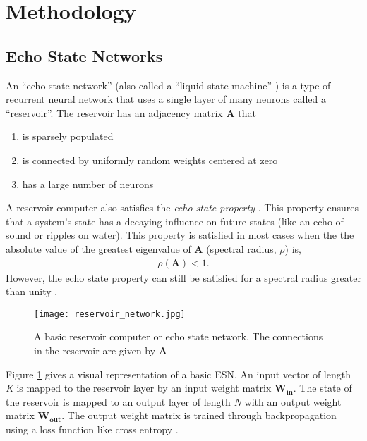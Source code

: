 \section{Methodology}

\subsection{Echo State Networks}
An ``echo state network'' (also
called a ``liquid state machine'' \cite{lukosevicius_practical_2012}) is a type
of recurrent neural network that uses a single layer of many neurons called a
``reservoir''. The reservoir has an adjacency matrix $\bm{A}$ that
\begin{enumerate}
	\item is sparsely populated
	\item is connected by uniformly random weights centered at zero
	\item has a large number of neurons
\end{enumerate}
A reservoir computer also satisfies the \textit{echo state property}
\cite{pathak_model-free_2018, lukosevicius_reservoir_2009}. This
property ensures that a system's state has a decaying influence on future states
(like an echo of sound or ripples on water). This property is satisfied in most
cases when the the absolute value of the greatest eigenvalue of
$\bm{A}$ (spectral radius, $\rho$) \cite{lukosevicius_reservoir_2009} is,
\begin{align}
	\rho(\bm{A}) < 1.
\end{align}
However, the echo state property can still be satisfied for a spectral radius
greater than unity \cite{lukosevicius_practical_2012}.

\begin{figure}[H]
	\texttt{[image: reservoir\_network.jpg]}
	\caption{A basic reservoir computer or echo state network. The connections in
	the reservoir are given by $\bm{A}$}
	\label{fig:RCmodel}
\end{figure}

Figure \ref{fig:RCmodel} gives a visual representation of a basic
\acrshort{ESN}. An
input vector of length \textit{K} is mapped to the reservoir layer by an input
weight matrix $\bm{W_{in}}$. The state of the reservoir is mapped to an output
layer of length \textit{N} with an output weight matrix $\bm{W_{out}}$.
The output weight matrix is trained through
backpropagation using a loss function like cross entropy
\cite{pathak_model-free_2018, vlachas_backpropagation_2020}.


